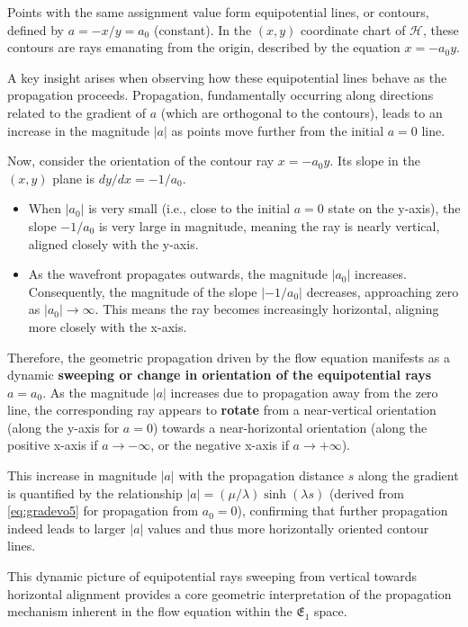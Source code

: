 Points with the same assignment value form equipotential lines, or contours, defined by $a = -x/y = a_0$ (constant). In the $(x,y)$ coordinate chart of $\mathcal{H}$, these contours are rays emanating from the origin, described by the equation $x = -a_0 y$.

A key insight arises when observing how these equipotential lines behave as the propagation proceeds. Propagation, fundamentally occurring along directions related to the gradient of $a$ (which are orthogonal to the contours), leads to an increase in the magnitude $|a|$ as points move further from the initial $a=0$ line.

Now, consider the orientation of the contour ray $x = -a_0 y$. Its slope in the $(x,y)$ plane is $dy/dx = -1/a_0$.
\begin{itemize}
    \item When $|a_0|$ is very small (i.e., close to the initial $a=0$ state on the y-axis), the slope $-1/a_0$ is very large in magnitude, meaning the ray is nearly vertical, aligned closely with the y-axis.
    \item As the wavefront propagates outwards, the magnitude $|a_0|$ increases. Consequently, the magnitude of the slope $|-1/a_0|$ decreases, approaching zero as $|a_0| \to \infty$. This means the ray becomes increasingly horizontal, aligning more closely with the x-axis.
\end{itemize}
Therefore, the geometric propagation driven by the flow equation manifests as a dynamic \textbf{sweeping or change in orientation of the equipotential rays} $a=a_0$. As the magnitude $|a|$ increases due to propagation away from the zero line, the corresponding ray appears to \textbf{rotate} from a near-vertical orientation (along the y-axis for $a=0$) towards a near-horizontal orientation (along the positive x-axis if $a \to -\infty$, or the negative x-axis if $a \to +\infty$).

This increase in magnitude $|a|$ with the propagation distance $s$ along the gradient is quantified by the relationship $|a| = (\mu/\lambda) \sinh(\lambda s)$ (derived from \eqref{eq:gradevo5} for propagation from $a_0=0$), confirming that further propagation indeed leads to larger $|a|$ values and thus more horizontally oriented contour lines.

This dynamic picture of equipotential rays sweeping from vertical towards horizontal alignment provides a core geometric interpretation of the propagation mechanism inherent in the flow equation within the $\mathfrak{E}_1$ space.

